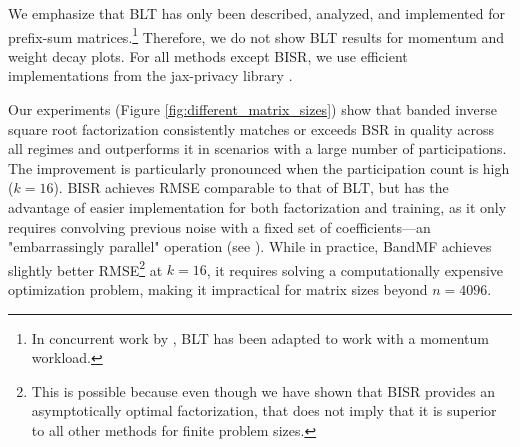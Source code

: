 \documentclass{article} %
\newcommand{\method}{banded inverse square root factorization\xspace}
\begin{document}
We emphasize that BLT has only been described, analyzed, and implemented for prefix-sum matrices.\footnote{In concurrent work by \citet{huang2025memory}, BLT has been adapted to work with a momentum workload.} Therefore, we do not show BLT results for momentum and weight decay plots. For all methods except BISR, we use efficient implementations from the jax-privacy library \citep{jax-privacy2022github}.

Our experiments (Figure \ref{fig:different_matrix_sizes}) show that \method consistently matches or exceeds BSR in quality across all regimes and outperforms it in scenarios with a large number of participations. The improvement is particularly pronounced when the participation count is high ($k = 16$). BISR achieves RMSE comparable to that of BLT, but has the advantage of easier implementation for both factorization and training, as it only requires convolving previous noise with a fixed set of coefficients—an "embarrassingly parallel" operation (see \citet{scalingmckenna2024}). While in practice, BandMF achieves slightly better RMSE\footnote{This is possible because even though we have shown that BISR provides an asymptotically optimal factorization, that does not imply that it is superior to all other methods for finite problem sizes. } at $k = 16$, it requires solving a computationally expensive optimization problem, making it impractical for matrix sizes beyond $n = 4096$. 
\end{document}
